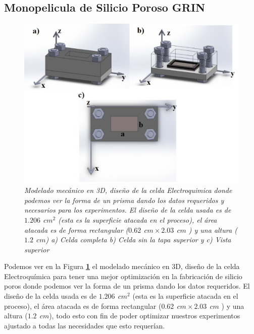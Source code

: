 \documentclass[a4paper,11pt,]{book}
\begin{document}
\subsection{Monopelicula de Silicio Poroso GRIN}
\begin{figure}[H]
	\centering
	\includegraphics[scale=.2]{../Images/celdan2} 
	\caption{\emph{ Modelado mecánico en 3D, diseño de la celda Electroquimica donde podemos ver la forma de un prisma dando los datos requeridos y necesarios para los experimentos.  El diseño de la celda usada  es de $1.206\ \ cm^2$ (esta es la superficie atacada en el proceso), el área atacada es de forma rectangular ($0.62\ \ cm \times 2.03 \ \ cm$ ) y una altura ($1.2\ \ cm $) a) Celda completa b) Celda sin la tapa superior y c) Vista superior}}
	\label{fig:por1}
\end{figure}
Podemos ver en la Figura \textbf{\ref{fig:por1}} el modelado mecánico en 3D, diseño de la celda Electroquímica para tener una mejor optimización en la fabricación de silicio poros donde podemos ver la forma de un prisma dando los datos requeridos.  El diseño de la celda usada  es de $1.206\ \ cm^2$ (esta es la superficie atacada en el proceso), el área atacada es de forma rectangular ($0.62\ \ cm \times 2.03 \ \ cm$ ) y una altura ($1.2\ \ cm $), todo esto con fin de poder optimizar nuestros experimentos ajustado a todas las necesidades que esto requerían.
\end{document}
